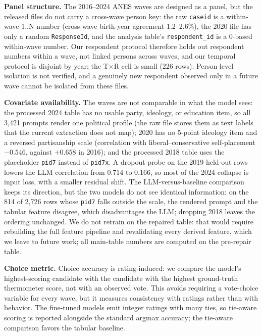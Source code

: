 \textbf{Panel structure.} The 2016--2024 ANES waves are designed as a
panel, but the released files do not carry a cross-wave person key: the
raw \texttt{caseid} is a within-wave 1..N number (cross-wave birth-year
agreement 1.2--2.6\%), the 2020 file has only a random
\texttt{ResponseId}, and the analysis table's \texttt{respondent\_id} is
a 0-based within-wave number. Our respondent protocol therefore holds
out respondent numbers within a wave, not linked persons across waves,
and our temporal protocol is disjoint by year; the T\(\times\)R cell is
small (226 rows). Person-level isolation is not verified, and a
genuinely new respondent observed only in a future wave cannot be
isolated from these files.

\textbf{Covariate availability.} The waves are not comparable in what
the model sees: the processed 2024 table has no usable party, ideology,
or education item, so all 3,421 prompts render one political profile
(the raw file stores them as text labels that the current extraction
does not map); 2020 has no 5-point ideology item and a reversed
partisanship scale (correlation with liberal--conservative
self-placement \(-0.546\), against \(+0.658\) in 2016); and the
processed 2018 table uses the placeholder \texttt{pid7} instead of
\texttt{pid7x}. A dropout probe on the 2019 held-out rows lowers the LLM
correlation from 0.714 to 0.166, so most of the 2024 collapse is input
loss, with a smaller residual shift. The LLM-versus-baseline comparison
keeps its direction, but the two models do not see identical
information: on the 814 of 2,726 rows whose \texttt{pid7} falls outside
the scale, the rendered prompt and the tabular feature disagree, which
disadvantages the LLM; dropping 2018 leaves the ordering unchanged. We
do not retrain on the repaired table: that would require rebuilding the
full feature pipeline and revalidating every derived feature, which we
leave to future work; all main-table numbers are computed on the
pre-repair table.

\textbf{Choice metric.} Choice accuracy is rating-induced: we compare
the model's highest-scoring candidate with the candidate with the
highest ground-truth thermometer score, not with an observed vote. This
avoids requiring a vote-choice variable for every wave, but it measures
consistency with ratings rather than with behavior. The fine-tuned
models emit integer ratings with many ties, so tie-aware scoring is
reported alongside the standard argmax accuracy; the tie-aware
comparison favors the tabular baseline.


